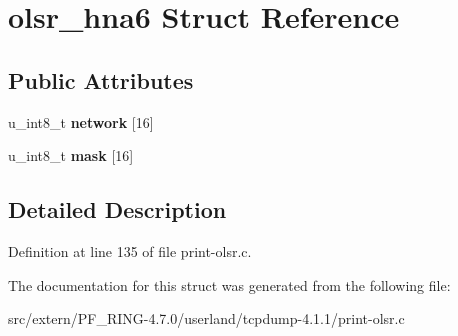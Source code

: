 \hypertarget{structolsr__hna6}{
\section{olsr\_\-hna6 Struct Reference}
\label{structolsr__hna6}
}
\subsection*{Public Attributes}
\begin{DoxyCompactItemize}
\item 
\hypertarget{structolsr__hna6_a31e71bcd33a792db3ea4b8ece02b48c6}{
u\_\-int8\_\-t {\bfseries network} \mbox{[}16\mbox{]}}
\label{structolsr__hna6_a31e71bcd33a792db3ea4b8ece02b48c6}

\item 
\hypertarget{structolsr__hna6_ae42dc4f4c19fa64b0242595ae812e92d}{
u\_\-int8\_\-t {\bfseries mask} \mbox{[}16\mbox{]}}
\label{structolsr__hna6_ae42dc4f4c19fa64b0242595ae812e92d}

\end{DoxyCompactItemize}


\subsection{Detailed Description}


Definition at line 135 of file print-\/olsr.c.



The documentation for this struct was generated from the following file:\begin{DoxyCompactItemize}
\item 
src/extern/PF\_\-RING-\/4.7.0/userland/tcpdump-\/4.1.1/print-\/olsr.c\end{DoxyCompactItemize}
